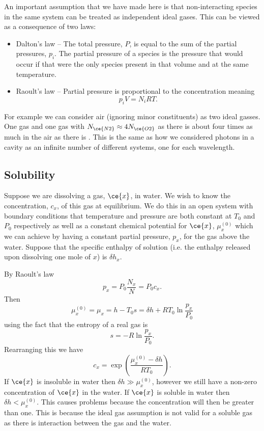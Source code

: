     An important assumption that we have made here is that non-interacting species in the same system can be treated as independent ideal gases.
    This can be viewed as a consequence of two laws:
    \begin{itemize}
        \item Dalton's law -- The total pressure, \(P\), is equal to the sum of the partial pressures, \(p_i\).
        The partial pressure of a species is the pressure that would occur if that were the only species present in that volume and at the same temperature.
        \item Raoult's law -- Partial pressure is proportional to the concentration meaning
        \[p_iV = N_iRT.\]
    \end{itemize}
    For example we can consider air (ignoring minor constituents) as two ideal gasses.
    One  gas and one  gas with \(N_{\ce{N2}} \approx 4N_{\ce{O2}}\) as there is about four times as much  in the air as there is .
    This is the same as how we considered photons in a cavity as an infinite number of different systems, one for each wavelength.
    
    \subsection{Solubility}
    Suppose we are dissolving a gas, \(\ce{x}\), in water.
    We wish to know the concentration, \(c_x\), of this gas at equilibrium.
    We do this in an open system with boundary conditions that temperature and pressure are both constant at \(T_0\) and \(P_0\) respectively as well as a constant chemical potential for \(\ce{x}\), \(\mu_x^{(0)}\) which we can achieve by having a constant partial pressure, \(p_x\), for the gas above the water.
    Suppose that the specific enthalpy of solution (i.e. the enthalpy released upon dissolving one mole of \(x\)) is \(\delta h_x\).
    
    By Raoult's law
    \[p_x = P_0\frac{N_x}{N} = P_0c_x.\]
    Then
    \[\mu_x^{(0)} = \mu_x = h - T_0s = \delta h + RT_0\ln\frac{p_x}{P_0}\]
    using the fact that the entropy of a real gas is
    \[s = -R\ln\frac{p_x}{P_0}.\]
    Rearranging this we have
    \[c_x = \exp\left(\frac{\mu_x^{(0)} - \delta h}{RT_0}\right).\]
    If \(\ce{x}\) is insoluble in water then \(\delta h \gg \mu_{x}^{(0)}\), however we still have a non-zero concentration of \(\ce{x}\) in the water.
    If \(\ce{x}\) is soluble in water then \(\delta h < \mu_x^{(0)}\).
    This causes problems because the concentration will then be greater than one.
    This is because the ideal gas assumption is not valid for a soluble gas as there is interaction between the gas and the water.
    
